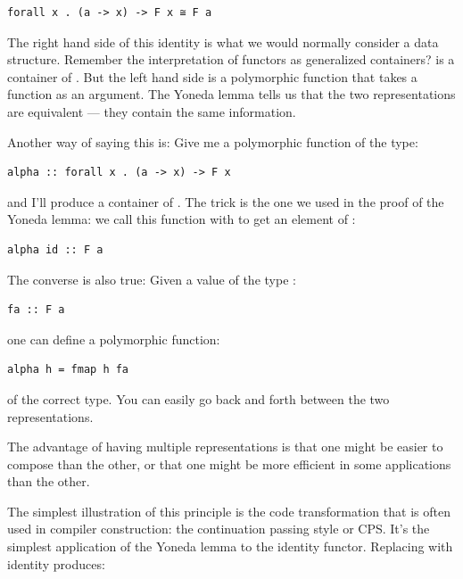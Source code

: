 \begin{Verbatim}[commandchars=\\\{\}]
forall x . (a -> x) -> F x ≅ F a
\end{Verbatim}

The right hand side of this identity is what we would normally consider
a data structure. Remember the interpretation of functors as generalized
containers?  is a container of . But the left
hand side is a polymorphic function that takes a function as an
argument. The Yoneda lemma tells us that the two representations are
equivalent --- they contain the same information.

Another way of saying this is: Give me a polymorphic function of the
type:

\begin{Verbatim}[commandchars=\\\{\}]
alpha :: forall x . (a -> x) -> F x
\end{Verbatim}

and I'll produce a container of . The trick is the one we used
in the proof of the Yoneda lemma: we call this function with 
to get an element of :

\begin{Verbatim}[commandchars=\\\{\}]
alpha id :: F a
\end{Verbatim}

The converse is also true: Given a value of the type :

\begin{Verbatim}[commandchars=\\\{\}]
fa :: F a
\end{Verbatim}

one can define a polymorphic function:

\begin{Verbatim}[commandchars=\\\{\}]
alpha h = fmap h fa
\end{Verbatim}

of the correct type. You can easily go back and forth between the two
representations.

The advantage of having multiple representations is that one might be
easier to compose than the other, or that one might be more efficient in
some applications than the other.

The simplest illustration of this principle is the code transformation
that is often used in compiler construction: the continuation passing
style or CPS. It's the simplest application of the Yoneda lemma to the
identity functor. Replacing  with identity produces:

